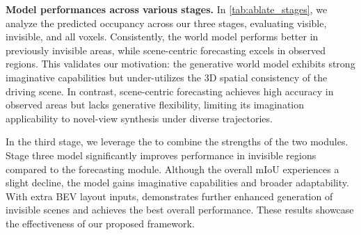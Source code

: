 \textbf{Model performances across various stages.}
In \cref{tab:ablate_stages}, we analyze the predicted occupancy across our three stages, evaluating visible, invisible, and all voxels.
Consistently, the world model performs better in previously invisible areas, while scene-centric forecasting excels in observed regions.
This validates our motivation: the generative world model exhibits strong imaginative capabilities but under-utilizes the 3D spatial consistency of the driving scene.
In contrast, scene-centric forecasting achieves high accuracy in observed areas but lacks generative flexibility, limiting its imagination applicability to novel-view synthesis under diverse trajectories.

In the third stage, we leverage the \ctln{} to combine the strengths of the two modules.
Stage three model significantly improves performance in invisible regions compared to the forecasting module.
Although the overall mIoU experiences a slight decline, the model gains imaginative capabilities and broader adaptability.
With extra BEV layout inputs, \mtd{} demonstrates further enhanced generation of invisible scenes and achieves the best overall performance.
These results showcase the effectiveness of our proposed framework.






